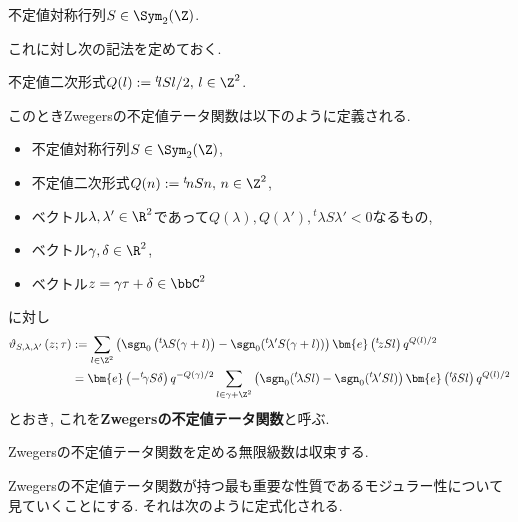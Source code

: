 \documentclass[11pt,b5paper,oneside,lualatex]{ltjsarticle} %
\numberwithin{equation}{section} %
\begin{document}
\begin{symb}
	不定値対称行列$ S \in \Sym_2(\Z) $.
\end{symb}

これに対し次の記法を定めておく. 

\begin{dfn}
	不定値二次形式$ Q(l) := {}^t\!l S l /2, \, l \in \Z^2 $.
\end{dfn}

このときZwegersの不定値テータ関数は以下のように定義される. 

\begin{dfn}
	\label{dfn:Zwegers_theta}
	\leavevmode %
	\begin{itemize}
		\item 不定値対称行列$ S \in \Sym_2(\Z) $,
		\item 不定値二次形式$ Q(n) := {}^t\!n S n, \, n \in \Z^2 $,
		\item ベクトル$ \lambda, \lambda' \in \R^2 $であって$ Q(\lambda), Q(\lambda'), {}^t\!\lambda S \lambda' < 0 $なるもの,
		\item ベクトル$ \gamma, \delta \in \R^2 $,
		\item ベクトル$ z = \gamma \tau + \delta \in \bbC^2 $
	\end{itemize}
	に対し
	\begin{align}
		\vartheta_{S, \lambda, \lambda'} \left( z; \tau \right)
		&:=
		\sum_{l \in \Z^2}
		\left(\sgn_0 \left( {}^t\!\lambda S (\gamma + l) \right) - \sgn_0( {}^t\!\lambda' S (\gamma + l) ) \right)
		\bm{e} \left( {}^t\!z S l \right) q^{Q(l)/2}
		\\
		&=
		\bm{e} \left( -{}^t\!\gamma S \delta \right) q^{-Q(\gamma)/2}		
		\sum_{l \in \gamma + \Z^2}
		\left(\sgn_0( {}^t\!\lambda S l ) - \sgn_0( {}^t\!\lambda' S l ) \right)
		\bm{e} \left( {}^t\!\delta S l \right) q^{Q(l)/2}
	\end{align}
	とおき, これを\textbf{Zwegersの不定値テータ関数}と呼ぶ. 
\end{dfn}

\begin{thm}
	Zwegersの不定値テータ関数を定める無限級数は収束する. 
\end{thm}

Zwegersの不定値テータ関数が持つ最も重要な性質であるモジュラー性について見ていくことにする. 
それは次のように定式化される. 
\end{document}
